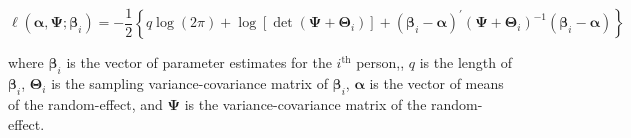 \begin{equation}
    \ell \left( \boldsymbol{\alpha}, \boldsymbol{\Psi} ; \boldsymbol{\beta}_{i} \right)
    =
    - \frac{1}{2}
    \left\{
    q
    \log
    \left(
    2
    \pi
    \right)
    +
    \log
    \left[
    \det
    \left(
    \boldsymbol{\Psi}
    +
    \boldsymbol{\Theta}_{i}
    \right)
    \right]
    +
    \left(
    \boldsymbol{\beta}_{i}
    -
    \boldsymbol{\alpha}
    \right)^{\prime}
    \left(
    \boldsymbol{\Psi}
    +
    \boldsymbol{\Theta}_{i}
    \right)^{-1}
    \left(
    \boldsymbol{\beta}_{i}
    -
    \boldsymbol{\alpha}
    \right)
    \right\}
\end{equation}

\noindent where $\boldsymbol{\beta}_{i}$ is the vector of parameter estimates for the $i^{\mathrm{th}}$ person,,
$q$ is the length of $\boldsymbol{\beta}_{i}$,
$\boldsymbol{\Theta}_{i}$ is the sampling variance-covariance matrix of $\boldsymbol{\beta}_{i}$,
$\boldsymbol{\alpha}$ is the vector of means of the random-effect,
and $\boldsymbol{\Psi}$ is the variance-covariance matrix of the random-effect.
